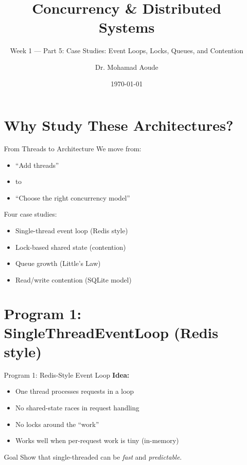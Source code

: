 \documentclass[11pt]{beamer}
\title{Concurrency \& Distributed Systems}
\subtitle{Week 1 --- Part 5: Case Studies: Event Loops, Locks, Queues, and Contention}
\author{Dr. Mohamad Aoude}
\institute{Lebanese University \\ Faculty of Engineering}
\date{\today}
\begin{document}
	
	\begin{frame}
		\titlepage
	\end{frame}
	
	\section{Why Study These Architectures?}
	
	\begin{frame}{From Threads to Architecture}
		We move from:
		\begin{itemize}
			\item ``Add threads''
			\item to
			\item ``Choose the right concurrency model''
		\end{itemize}

		
		Four case studies:
		\begin{itemize}
			\item Single-thread event loop (Redis style)
			\item Lock-based shared state (contention)
			\item Queue growth (Little's Law)
			\item Read/write contention (SQLite model)
		\end{itemize}
	\end{frame}
	
	\section{Program 1: SingleThreadEventLoop (Redis style)}
	
	\begin{frame}{Program 1: Redis-Style Event Loop}
		\textbf{Idea:}
		\begin{itemize}
			\item One thread processes requests in a loop
			\item No shared-state races in request handling
			\item No locks around the ``work''
			\item Works well when per-request work is tiny (in-memory)
		\end{itemize}

		
		\begin{block}{Goal}
			Show that single-threaded can be \emph{fast} and \emph{predictable}.
		\end{block}
	\end{frame}
	
\end{document}
